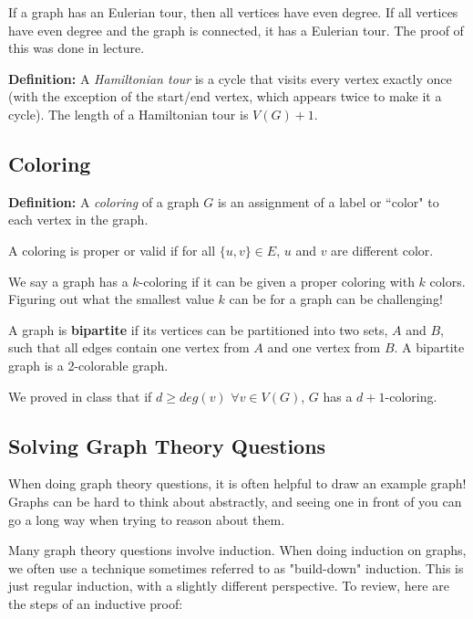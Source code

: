 \documentclass[12pt,letterpaper]{article}
\newcommand\definition{\textbf{Definition: }}
\begin{document}
If a graph has an Eulerian tour, then all vertices have even degree. If all vertices have even degree and the graph is connected, it has a Eulerian tour. The proof of this was done in lecture.

\definition A \emph{Hamiltonian tour} is a cycle that visits every vertex exactly once (with the exception of the start/end vertex, which appears twice to make it a cycle). The length of a Hamiltonian tour is $V(G)+1$.

\subsection{Coloring}
\definition A \emph{coloring} of a graph $G$ is an assignment of a label or ``color" to each vertex in the graph.

A coloring is proper or valid if for all $\{u,v\} \in E$, $u$ and $v$ are different color.

We say a graph has a $k$-coloring if it can be given a proper coloring with $k$ colors. Figuring out what the smallest value $k$ can be for a graph can be challenging!

A graph is \textbf{bipartite} if its vertices can be partitioned into two sets, $A$ and $B$, such that all edges contain one vertex from $A$ and one vertex from $B$. A bipartite graph is a 2-colorable graph.

We proved in class that if $d \geq deg(v)$ $\forall v \in V(G)$, $G$ has a $d+1$-coloring.

\subsection{Solving Graph Theory Questions}

When doing graph theory questions, it is often helpful to draw an example graph! Graphs can be hard to think about abstractly, and seeing one in front of you can go a long way when trying to reason about them. 

Many graph theory questions involve induction. When doing induction on graphs, we often use a technique sometimes referred to as "build-down" induction. This is just regular induction, with a slightly different perspective. To review, here are the steps of an inductive proof:
\end{document}
